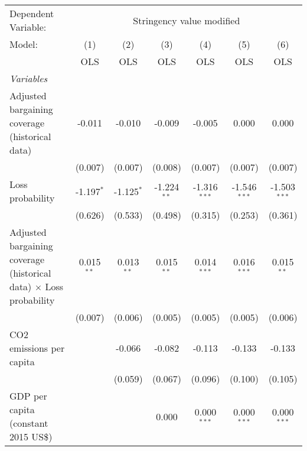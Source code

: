 
\begingroup
\centering
\begin{tabular}{lcccccc}
   \toprule
   Dependent Variable: & \multicolumn{6}{c}{Stringency value modified}\\
   Model:                                                                    & (1)          & (2)          & (3)           & (4)            & (5)            & (6)\\  
                                                                             &  OLS         & OLS          & OLS           & OLS            & OLS            & OLS\\  
   \midrule
   \emph{Variables}\\
   Adjusted bargaining coverage (historical data)                            & -0.011       & -0.010       & -0.009        & -0.005         & 0.000          & 0.000\\   
                                                                             & (0.007)      & (0.007)      & (0.008)       & (0.007)        & (0.007)        & (0.007)\\   
   Loss probability                                                          & -1.197$^{*}$ & -1.125$^{*}$ & -1.224$^{**}$ & -1.316$^{***}$ & -1.546$^{***}$ & -1.503$^{***}$\\   
                                                                             & (0.626)      & (0.533)      & (0.498)       & (0.315)        & (0.253)        & (0.361)\\   
   Adjusted bargaining coverage (historical data) $\times$ Loss probability  & 0.015$^{**}$ & 0.013$^{**}$ & 0.015$^{**}$  & 0.014$^{***}$  & 0.016$^{***}$  & 0.015$^{**}$\\   
                                                                             & (0.007)      & (0.006)      & (0.005)       & (0.005)        & (0.005)        & (0.006)\\   
   CO2 emissions per capita                                                  &              & -0.066       & -0.082        & -0.113         & -0.133         & -0.133\\   
                                                                             &              & (0.059)      & (0.067)       & (0.096)        & (0.100)        & (0.105)\\   
   GDP per capita (constant 2015 US\$)                                       &              &              & 0.000         & 0.000$^{***}$  & 0.000$^{***}$  & 0.000$^{***}$\\   

\end{tabular}
